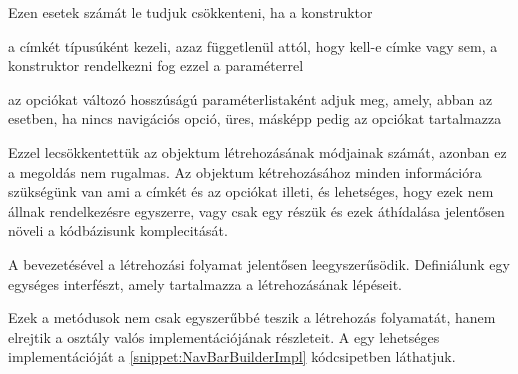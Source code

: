 Ezen esetek számát le tudjuk csökkenteni, ha a konstruktor \par

\begin{listing}
	\item a címkét  típusúként kezeli, azaz függetlenül attól, hogy kell-e címke vagy sem, a konstruktor rendelkezni fog ezzel a paraméterrel
	\item az opciókat változó hosszúságú paraméterlistaként adjuk meg, amely, abban az esetben, ha nincs navigációs opció, üres, másképp pedig az opciókat tartalmazza
\end{listing} \par


Ezzel lecsökkentettük az objektum létrehozásának módjainak számát, azonban ez a megoldás nem rugalmas. Az objektum kétrehozásához minden információra szükségünk van ami a címkét és az opciókat illeti, és lehetséges, hogy ezek nem állnak rendelkezésre egyszerre, vagy csak egy részük és ezek áthídalása jelentősen növeli a kódbázisunk komplecitását. \par

A  bevezetésével a létrehozási folyamat jelentősen leegyszerűsödik. Definiálunk egy egységes interfészt, amely tartalmazza a  létrehozásának lépéseit.


Ezek a metódusok nem csak egyszerűbbé teszik a létrehozás folyamatát, hanem elrejtik a  osztály valós implementációjának részleteit. A  egy lehetséges implementációját a \ref{snippet:NavBarBuilderImpl} kódcsipetben láthatjuk.

